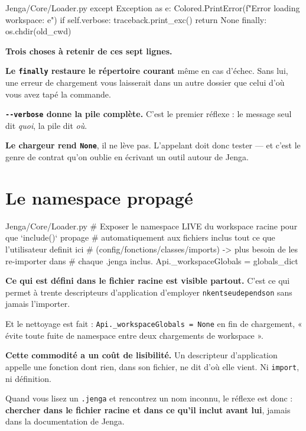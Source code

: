 \begin{nkcode}{Jenga/Core/Loader.py}
except Exception as e:
    Colored.PrintError(f"Error loading workspace: {e}")
    if self.verbose:
        traceback.print_exc()
    return None
finally:
    os.chdir(old_cwd)
\end{nkcode}

\begin{nkretenir}
\textbf{Trois choses à retenir de ces sept lignes.}

\textbf{Le \texttt{finally} restaure le répertoire courant} même en cas d'échec.
Sans lui, une erreur de chargement vous laisserait dans un autre dossier que
celui d'où vous avez tapé la commande.

\textbf{\texttt{-{}-verbose} donne la pile complète.} C'est le premier réflexe : le
message seul dit \emph{quoi}, la pile dit \emph{où}.

\textbf{Le chargeur rend \texttt{None}}, il ne lève pas. L'appelant doit donc
tester --- et c'est le genre de contrat qu'on oublie en écrivant un outil autour
de Jenga.
\end{nkretenir}

\section{Le namespace propagé}

\begin{nkcode}{Jenga/Core/Loader.py}
# Exposer le namespace LIVE du workspace racine pour que `include()` propage
# automatiquement aux fichiers inclus tout ce que l'utilisateur definit ici
# (config/fonctions/classes/imports) -> plus besoin de les re-importer dans
# chaque .jenga inclus.
Api._workspaceGlobals = globals_dict
\end{nkcode}

\begin{nkretenir}
\textbf{Ce qui est défini dans le fichier racine est visible partout.} C'est ce
qui permet à trente descripteurs d'application d'employer
\texttt{nkentseudependson} sans jamais l'importer.

Et le nettoyage est fait : \texttt{Api.\_workspaceGlobals = None} en fin de
chargement, « évite toute fuite de namespace entre deux chargements de
workspace ».
\end{nkretenir}

\begin{nkpiege}
\textbf{Cette commodité a un coût de lisibilité.} Un descripteur d'application
appelle une fonction dont rien, dans son fichier, ne dit d'où elle vient. Ni
\texttt{import}, ni définition.

Quand vous lisez un \texttt{.jenga} et rencontrez un nom inconnu, le réflexe est
donc : \textbf{chercher dans le fichier racine et dans ce qu'il inclut avant
lui}, jamais dans la documentation de Jenga.
\end{nkpiege}


